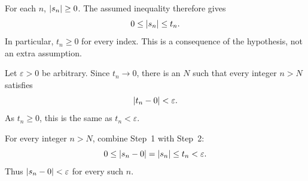 For each $n$, $\left|s_n\right|\ge0$. The assumed inequality therefore gives
\[
 0\le\left|s_n\right|\le t_n.
\]
In particular, $t_n\ge0$ for every index. This is a consequence of
the hypothesis, not an extra assumption.

Let $\varepsilon>0$ be arbitrary. Since $t_n\to0$, there is an $N$
such that every integer $n>N$ satisfies
\[
 \left|t_n-0\right|<\varepsilon.
\]
As $t_n\ge0$, this is the same as $t_n<\varepsilon$.

For every integer $n>N$, combine Step~1 with Step~2:
\[
 0\le\left|s_n-0\right|=\left|s_n\right|\le t_n<\varepsilon.
\]
Thus $\left|s_n-0\right|<\varepsilon$ for every such $n$.

